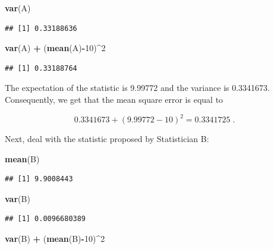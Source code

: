 \documentclass[]{krantz}
\makeatletter
\newenvironment{Shaded}{\begin{snugshade}}{\end{snugshade}}
\newcommand{\KeywordTok}[1]{\textcolor[rgb]{0.13,0.29,0.53}{\textbf{#1}}}
\newcommand{\DecValTok}[1]{\textcolor[rgb]{0.00,0.00,0.81}{#1}}
\newcommand{\StringTok}[1]{\textcolor[rgb]{0.31,0.60,0.02}{#1}}
\newcommand{\OperatorTok}[1]{\textcolor[rgb]{0.81,0.36,0.00}{\textbf{#1}}}
\newcommand{\NormalTok}[1]{#1}
\newenvironment{kframe}{%
\medskip{}
\setlength{\fboxsep}{.8em}
 \def\at@end@of@kframe{}%
 \ifinner\ifhmode%
  \def\at@end@of@kframe{\end{minipage}}%
  \begin{minipage}{\columnwidth}%
 \fi\fi%
 \def\FrameCommand##1{\hskip\@totalleftmargin \hskip-\fboxsep
 \colorbox{shadecolor}{##1}\hskip-\fboxsep
     \hskip-\linewidth \hskip-\@totalleftmargin \hskip\columnwidth}%
 \MakeFramed {\advance\hsize-\width
   \@totalleftmargin\z@ \linewidth\hsize
   \@setminipage}}%
 {\par\unskip\endMakeFramed%
 \at@end@of@kframe}
\renewenvironment{Shaded}{\begin{kframe}}{\end{kframe}}
\theoremstyle{definition}
\theoremstyle{definition}
\theoremstyle{definition}
\theoremstyle{remark}
\makeatother
\begin{document}
\begin{Shaded}
\begin{Highlighting}[]
\KeywordTok{var}\NormalTok{(A)}
\end{Highlighting}
\end{Shaded}

\begin{verbatim}
## [1] 0.33188636
\end{verbatim}

\begin{Shaded}
\begin{Highlighting}[]
\KeywordTok{var}\NormalTok{(A) }\OperatorTok{+}\StringTok{ }\NormalTok{(}\KeywordTok{mean}\NormalTok{(A)}\OperatorTok{-}\DecValTok{10}\NormalTok{)}\OperatorTok{^}\DecValTok{2}
\end{Highlighting}
\end{Shaded}

\begin{verbatim}
## [1] 0.33188764
\end{verbatim}

The expectation of the statistic is 9.99772 and the variance is
0.3341673. Consequently, we get that the mean square error is equal to

\[0.3341673 + (9.99772 - 10)^2 = 0.3341725\;.\]

Next, deal with the statistic proposed by Statistician B:

\begin{Shaded}
\begin{Highlighting}[]
\KeywordTok{mean}\NormalTok{(B)}
\end{Highlighting}
\end{Shaded}

\begin{verbatim}
## [1] 9.9008443
\end{verbatim}

\begin{Shaded}
\begin{Highlighting}[]
\KeywordTok{var}\NormalTok{(B)}
\end{Highlighting}
\end{Shaded}

\begin{verbatim}
## [1] 0.0096680389
\end{verbatim}

\begin{Shaded}
\begin{Highlighting}[]
\KeywordTok{var}\NormalTok{(B) }\OperatorTok{+}\StringTok{ }\NormalTok{(}\KeywordTok{mean}\NormalTok{(B)}\OperatorTok{-}\DecValTok{10}\NormalTok{)}\OperatorTok{^}\DecValTok{2}
\end{Highlighting}
\end{Shaded}
\end{document}

